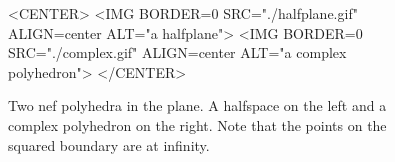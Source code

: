 \begin{figure}[htbp]
\begin{ccTexOnly}
\begin{center}
\end{center}
\end{ccTexOnly}
\caption{Two nef polyhedra in the plane. A halfspace on the left and a
complex polyhedron on the right. Note that the points on the squared
boundary are at infinity.}
\label{extsegs}    
\begin{ccHtmlOnly}
<CENTER>
<IMG BORDER=0 SRC="./halfplane.gif" ALIGN=center
ALT="a halfplane">
<IMG BORDER=0 SRC="./complex.gif" ALIGN=center
ALT="a complex polyhedron">
</CENTER>
\end{ccHtmlOnly}
\end{figure}
